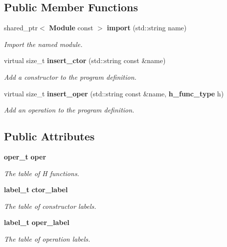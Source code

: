 \subsection*{Public Member Functions}
\begin{CompactItemize}
\item 
shared\_\-ptr$<$ {\bf Module} const  $>$ {\bf import} (std::string name)\label{structsprite_1_1Program_a1}

\begin{CompactList}\small\item\em Import the named module. \item\end{CompactList}\item 
virtual size\_\-t {\bf insert\_\-ctor} (std::string const \&name)\label{structsprite_1_1Program_a3}

\begin{CompactList}\small\item\em Add a constructor to the program definition. \item\end{CompactList}\item 
virtual size\_\-t {\bf insert\_\-oper} (std::string const \&name, {\bf h\_\-func\_\-type} h)\label{structsprite_1_1Program_a4}

\begin{CompactList}\small\item\em Add an operation to the program definition. \item\end{CompactList}\end{CompactItemize}
\subsection*{Public Attributes}
\begin{CompactItemize}
\item 
{\bf oper\_\-t} {\bf oper}\label{structsprite_1_1Program_o0}

\begin{CompactList}\small\item\em The table of H functions. \item\end{CompactList}\item 
{\bf label\_\-t} {\bf ctor\_\-label}\label{structsprite_1_1Program_o1}

\begin{CompactList}\small\item\em The table of constructor labels. \item\end{CompactList}\item 
{\bf label\_\-t} {\bf oper\_\-label}\label{structsprite_1_1Program_o2}

\begin{CompactList}\small\item\em The table of operation labels. \item\end{CompactList}\end{CompactItemize}
